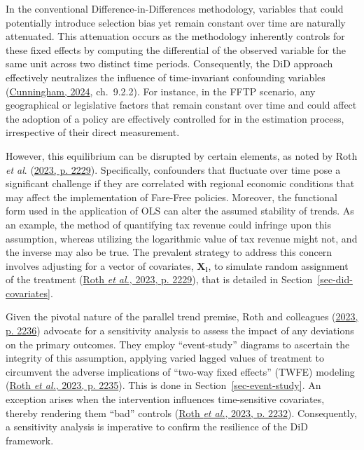 \documentclass[12pt, a4paper, twoside]{article}
\numberwithin{equation}{subsection} %
\begin{document}
In the conventional Difference-in-Differences methodology, variables
that could potentially introduce selection bias yet remain constant over
time are naturally attenuated. This attenuation occurs as the
methodology inherently controls for these fixed effects by computing the
differential of the observed variable for the same unit across two
distinct time periods. Consequently, the DiD approach effectively
neutralizes the influence of time-invariant confounding variables
(\protect\hyperlink{ref-cunningham_causal_2024}{Cunningham, 2024},
ch.~9.2.2). For instance, in the FFTP scenario, any geographical or
legislative factors that remain constant over time and could affect the
adoption of a policy are effectively controlled for in the estimation
process, irrespective of their direct measurement.

However, this equilibrium can be disrupted by certain elements, as noted
by Roth \textit{et al}. (\protect\hyperlink{ref-roth_whats_2023}{2023,
p. 2229}). Specifically, confounders that fluctuate over time pose a
significant challenge if they are correlated with regional economic
conditions that may affect the implementation of Fare-Free policies.
Moreover, the functional form used in the application of OLS can alter
the assumed stability of trends. As an example, the method of
quantifying tax revenue could infringe upon this assumption, whereas
utilizing the logarithmic value of tax revenue might not, and the
inverse may also be true. The prevalent strategy to address this concern
involves adjusting for a vector of covariates, \(\boldsymbol{X_i}\), to
simulate random assignment of the treatment
(\protect\hyperlink{ref-roth_whats_2023}{Roth \emph{et al.}, 2023, p.
2229}), that is detailed in Section~\ref{sec-did-covariates}.

Given the pivotal nature of the parallel trend premise, Roth and
colleagues (\protect\hyperlink{ref-roth_whats_2023}{2023, p. 2236})
advocate for a sensitivity analysis to assess the impact of any
deviations on the primary outcomes. They employ ``event-study'' diagrams
to ascertain the integrity of this assumption, applying varied lagged
values of treatment to circumvent the adverse implications of ``two-way
fixed effects'' (TWFE) modeling
(\protect\hyperlink{ref-roth_whats_2023}{Roth \emph{et al.}, 2023, p.
2235}). This is done in Section~\ref{sec-event-study}. An exception
arises when the intervention influences time-sensitive covariates,
thereby rendering them ``bad'' controls
(\protect\hyperlink{ref-roth_whats_2023}{Roth \emph{et al.}, 2023, p.
2232}). Consequently, a sensitivity analysis is imperative to confirm
the resilience of the DiD framework.
\end{document}

